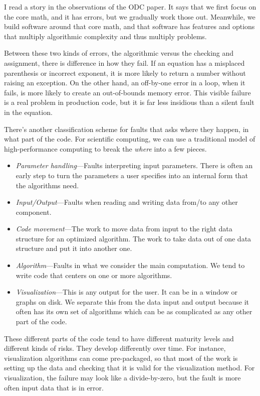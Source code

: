 \documentclass[fleqn,10pt]{olplainarticle}
\begin{document}
I read a story in the observations of the ODC paper. It says
that we first focus on the core math, and it has errors, but we
gradually work those out. Meanwhile, we build software around that
core math, and that software has features and options that multiply
algorithmic complexity and thus multiply problems.

Between these two kinds of errors, the algorithmic versus the
checking and assignment, there is difference in how they fail.
If an equation has a misplaced parenthesis or incorrect exponent,
it is more likely to return a number without raising an exception.
On the other hand, an off-by-one error in a loop, when it fails,
is more likely to create an out-of-bounds memory error. This visible
failure is a real problem in production code, but it is far
less insidious than a silent fault in the equation.

There's another classification scheme for faults that asks
where they happen, in what part of the code. For scientific computing,
we can use a traditional model of high-performance computing
to break the \emph{where} into a few pieces.
\begin{itemize}
    \item \emph{Parameter handling}---Faults interpreting input parameters.
    There is often an early step to turn the parameters a user specifies
    into an internal form that the algorithms need.

    \item \emph{Input/Output}---Faults when reading and writing
    data from/to any other component.

    \item \emph{Code movement}---The work to move data from input
    to the right data structure for an optimized algorithm. The work
    to take data out of one data structure and put it into another one.

    \item \emph{Algorithm}---Faults in what we consider the main
    computation. We tend to write code that centers on one
    or more algorithms.

    \item \emph{Visualization}---This is any output for the user. It
    can be in a window or graphs on disk. We separate this from the
    data input and output because it often has its own set of
    algorithms which can be as complicated as any other part of the code.
\end{itemize}
These different parts of the code tend to have different maturity levels
and different kinds of risks. They develop differently over time.
For instance, visualization algorithms can come pre-packaged, so that
most of the work is setting up the data and checking that it is valid
for the visualization method. For visualization, the failure may look
like a divide-by-zero, but the fault is more often input data that
is in error.
\end{document}

